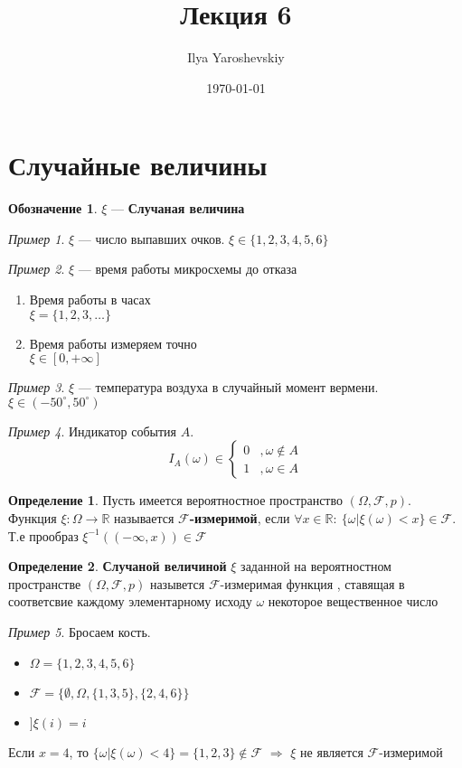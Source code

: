 \documentclass[english]{article}
\author{Ilya Yaroshevskiy}
\date{\today}
\title{Лекция 6}
\newcommand{\R}{\mathbb{R}}
\theoremstyle{plain}
\theoremstyle{remark}
\newtheorem*{examp}{Пример}
\theoremstyle{definition}
\newtheorem*{definition}{Определение}
\newtheorem*{symb}{Обозначение}
\begin{document}
\maketitle
\tableofcontents

\newcommand{\todo}{{\color{red}\text{Доделать }}}
\newcommand{\fixme}{{\color{red}\text{Исправить }}}


\section{Случайные величины}
\label{sec:org12cf85c}
\begin{symb}
\(\xi\) --- \textbf{Случаная величина}
\end{symb}
\begin{examp}
\(\xi\) --- число выпавших очков. \(\xi \in \{1, 2, 3, 4, 5, 6\}\)
\end{examp}
\begin{examp}
\(\xi\) --- время работы микросхемы до отказа
\begin{enumerate}
\item Время работы в часах \\
\(\xi = \{1, 2, 3, \dots \}\)
\item Время работы измеряем точно \\
\(\xi \in [0, +\infty]\)
\end{enumerate}
\end{examp}
\begin{examp}
\(\xi\) --- температура воздуха в случайный момент вермени. \(\xi \in (-50^\circ, 50^\circ)\)
\end{examp}
\begin{examp}
Индикатор события \(A\).
\[I_A(\omega) \in \begin{cases} 0 & , \omega \not \in A \\ 1 & , \omega \in A\end{cases}\]
\end{examp}
\begin{definition}
Пусть имеется вероятностное пространство \((\Omega, \mathcal{F}, p)\). Функция \(\xi: \Omega \to \R\) называется \textbf{\(\mathcal{F}\)-измеримой}, если \(\forall x \in \R:\ \{\omega | \xi(\omega) < x\} \in \mathcal{F}\). Т.е прообраз \(\xi^{-1}((- \infty, x)) \in \mathcal{F}\)
\end{definition}
\begin{definition}
\textbf{Случаной величиной} \(\xi\) заданной на вероятностном пространстве \((\Omega, \mathcal{F}, p)\)  назывется \(\mathcal{F}\)-измеримая функция \fixme, ставящая в соответсвие каждому элементарному исходу \(\omega\) некоторое вещественное число
\end{definition}
\begin{examp}
Бросаем кость.
\begin{itemize}
\item \(\Omega = \{1, 2, 3, 4, 5, 6\}\)
\item \(\mathcal{F} = \{\emptyset, \Omega, \{1, 3, 5\}, \{2, 4, 6\}\}\)
\item \(] \xi(i) = i\)
\end{itemize}
Если \(x = 4\), то \(\{\omega | \xi(\omega) < 4\} = \{1, 2, 3\} \not\in \mathcal{F}\) \(\Rightarrow\) \(\xi\) не является \(\mathcal{F}\)-измеримой
\end{examp}
\end{document}
